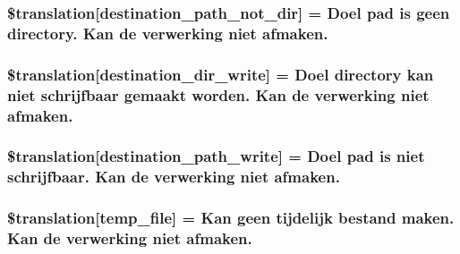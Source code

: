 \subsubsection[{\$translation}]{\setlength{\rightskip}{0pt plus 5cm}\$translation\mbox{[}\textquotesingle{}destination\+\_\+path\+\_\+not\+\_\+dir\textquotesingle{}\mbox{]} = \textquotesingle{}Doel pad is geen directory. Kan de verwerking niet afmaken.\textquotesingle{}}\label{class_8upload_8nl___n_l_8php_a5704a67137126e8c87b7a364175929d4}
\hypertarget{class_8upload_8nl___n_l_8php_a97608ea194a616db49141a0e6dee900c}{}
\subsubsection[{\$translation}]{\setlength{\rightskip}{0pt plus 5cm}\$translation\mbox{[}\textquotesingle{}destination\+\_\+dir\+\_\+write\textquotesingle{}\mbox{]} = \textquotesingle{}Doel directory kan niet schrijfbaar gemaakt worden. Kan de verwerking niet afmaken.\textquotesingle{}}\label{class_8upload_8nl___n_l_8php_a97608ea194a616db49141a0e6dee900c}
\hypertarget{class_8upload_8nl___n_l_8php_a40e4e1962226b89fd76da5819a9602b0}{}
\subsubsection[{\$translation}]{\setlength{\rightskip}{0pt plus 5cm}\$translation\mbox{[}\textquotesingle{}destination\+\_\+path\+\_\+write\textquotesingle{}\mbox{]} = \textquotesingle{}Doel pad is niet schrijfbaar. Kan de verwerking niet afmaken.\textquotesingle{}}\label{class_8upload_8nl___n_l_8php_a40e4e1962226b89fd76da5819a9602b0}
\hypertarget{class_8upload_8nl___n_l_8php_a2baece8da11e20d45175db91851ec3e3}{}
\subsubsection[{\$translation}]{\setlength{\rightskip}{0pt plus 5cm}\$translation\mbox{[}\textquotesingle{}temp\+\_\+file\textquotesingle{}\mbox{]} = \textquotesingle{}Kan geen tijdelijk bestand maken. Kan de verwerking niet afmaken.\textquotesingle{}}\label{class_8upload_8nl___n_l_8php_a2baece8da11e20d45175db91851ec3e3}
\hypertarget{class_8upload_8nl___n_l_8php_a922967ca2df0efdd455261142d8e5715}{}

